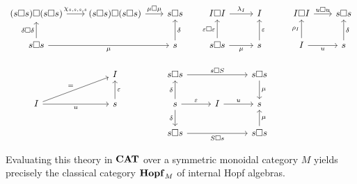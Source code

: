 \begin{examples}
\begin{enumerate}
{\[\begin{tikzcd}[column sep = 0.7 cm]
(s\square s)\square (s\square s) \arrow[r, "{\chi_{s,s,s,s}}"]                 & (s\square s)\square (s\square s) \arrow[r, "\mu\square \mu"] & s\square s                                                          & I\square I \arrow[r, "\lambda_I"]                                        & I                                                                               & I\square I \arrow[r, "u\square u"]     & s\square s             \\
s\square s \arrow[u, "\delta\square \delta"] \arrow[rr, "\mu"']                &                                                              & s \arrow[u, "\delta"']                                              & s\square s \arrow[r, "\mu"'] \arrow[u, "\varepsilon\square \varepsilon"] & s \arrow[u, "\varepsilon"']                                                     & I \arrow[r, "u"'] \arrow[u, "\rho_I"]  & s \arrow[u, "\delta"'] \\
                                                                               & I                                                            & s\square s \arrow[rr, "s\square S"]                                 &                                                                          & s\square s \arrow[d, "\mu"]                                                     &                                        &                        \\
I \arrow[r, "u"'] \arrow[ru, "="]                                              & s \arrow[u, "\varepsilon"']                                  & s \arrow[r, "\varepsilon"] \arrow[u, "\delta"] \arrow[d, "\delta"'] & I \arrow[r, "u"]                                                         & s                                                                               &                                        &                        \\
                                                                               &                                                              & s\square s \arrow[rr, "S\square s"']                                &                                                                          & s\square s \arrow[u, "\mu"']                                                    &                                        &
\end{tikzcd}
\]
}

    Evaluating this theory in $\mathbf{CAT}$ over a symmetric monoidal category $M$ yields precisely the classical category $\mathbf{Hopf}_M$ of internal Hopf algebras.


\end{enumerate}
\end{examples}
